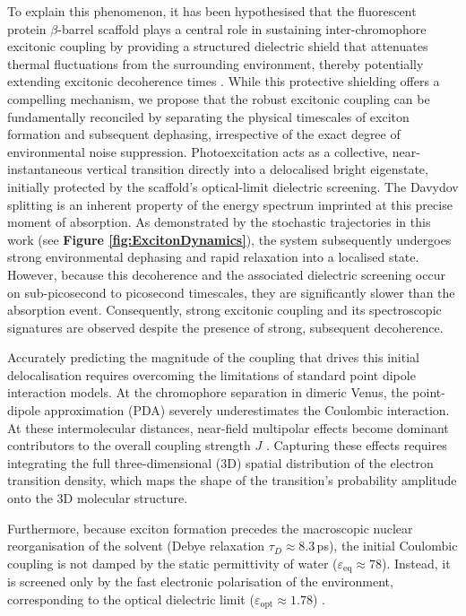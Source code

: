 \documentclass[journal=jpclcd, manuscript=letter, layout=twocolumn, doi=true]{achemso}
\begin{document}
To explain this phenomenon, it has been hypothesised that the fluorescent protein $\beta$-barrel scaffold plays a central role in sustaining inter-chromophore excitonic coupling by providing a structured dielectric shield that attenuates thermal fluctuations from the surrounding environment, thereby potentially extending excitonic decoherence times \cite{kim2019venusa206}. While this protective shielding offers a compelling mechanism, we propose that the robust excitonic coupling can be fundamentally reconciled by separating the physical timescales of exciton formation and subsequent dephasing, irrespective of the exact degree of environmental noise suppression. Photoexcitation acts as a collective, near-instantaneous vertical transition directly into a delocalised bright eigenstate, initially protected by the scaffold's optical-limit dielectric screening. The Davydov splitting is an inherent property of the energy spectrum imprinted at this precise moment of absorption. As demonstrated by the stochastic trajectories in this work (see {\bf Figure \ref{fig:ExcitonDynamics}}), the system subsequently undergoes strong environmental dephasing and rapid relaxation into a localised state. However, because this decoherence and the associated dielectric screening occur on sub-picosecond to picosecond timescales, they are significantly slower than the absorption event. Consequently, strong excitonic coupling and its spectroscopic signatures are observed despite the presence of strong, subsequent decoherence.

Accurately predicting the magnitude of the coupling that drives this initial delocalisation requires overcoming the limitations of standard point dipole interaction models. At the chromophore separation in dimeric Venus, the point-dipole approximation (PDA) severely underestimates the Coulombic interaction. At these intermolecular distances, near-field multipolar effects become dominant contributors to the overall coupling strength $J$ \cite{scholes2003, kitohnishioka2017forster}. Capturing these effects requires integrating the full three-dimensional (3D) spatial distribution of the electron transition density, which maps the shape of the transition's probability amplitude onto the 3D molecular structure. 

Furthermore, because exciton formation precedes the macroscopic nuclear reorganisation of the solvent (Debye relaxation $\tau_D \approx 8.3$\,ps), the initial Coulombic coupling is not damped by the static permittivity of water ($\varepsilon_{\mathrm{eq}} \approx 78$). Instead, it is screened only by the fast electronic polarisation of the environment, corresponding to the optical dielectric limit ($\varepsilon_{\mathrm{opt}} \approx 1.78$) \cite{mennucci2012, scholes2003}.
\end{document}
